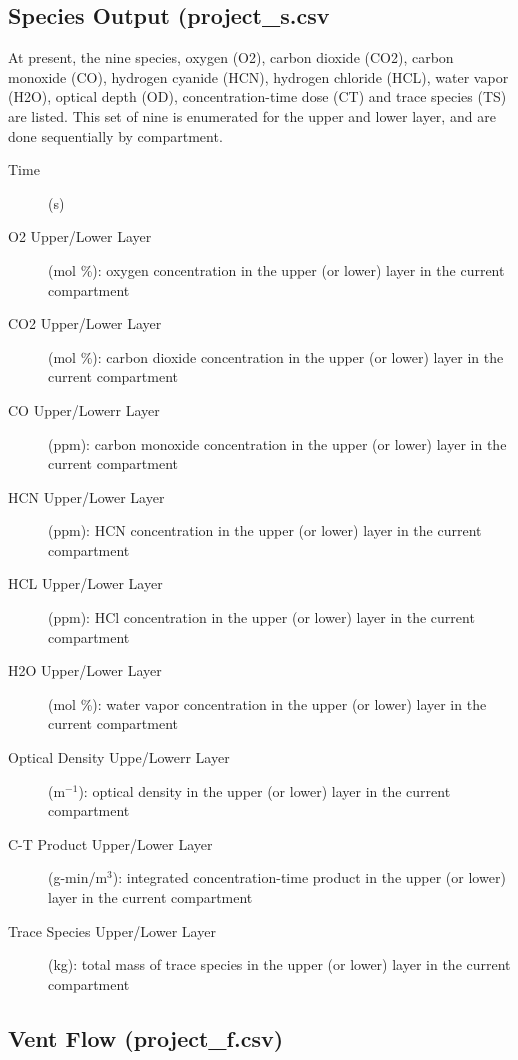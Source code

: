 \subsection{Species Output (project\_s.csv}

At present, the nine species, oxygen (O2), carbon dioxide (CO2), carbon monoxide (CO),  hydrogen cyanide (HCN), hydrogen chloride (HCL), water vapor (H2O), optical depth (OD), concentration-time dose (CT) and trace species (TS) are listed. This set of nine is enumerated for the upper and lower layer, and are done sequentially by compartment.
\begin{description}
\item[Time] (s)
\item[O2 Upper/Lower Layer] (mol \%): oxygen concentration in the upper (or lower) layer in the current compartment
\item[CO2 Upper/Lower Layer] (mol \%):  carbon dioxide concentration in the upper (or lower) layer in the current compartment
\item[CO Upper/Lowerr Layer] (ppm):  carbon monoxide concentration in the upper (or lower) layer in the current compartment
\item[HCN Upper/Lower Layer] (ppm):  HCN concentration in the upper (or lower) layer in the current compartment
\item[HCL Upper/Lower Layer] (ppm):  HCl concentration in the upper (or lower) layer in the current compartment
\item[H2O Upper/Lower Layer] (mol \%):  water vapor concentration in the upper (or lower) layer in the current compartment
\item[Optical Density Uppe/Lowerr Layer] (m$^{-1}$):  optical density in the upper (or lower) layer in the current compartment
\item[C-T Product Upper/Lower Layer] (g-min/m$^3$):  integrated concentration-time product in the upper (or lower) layer in the current compartment
\item[Trace Species Upper/Lower Layer] (kg):  total mass of trace species in the upper (or lower) layer in the current compartment
\end{description}

\subsection{Vent Flow (project\_f.csv)}


